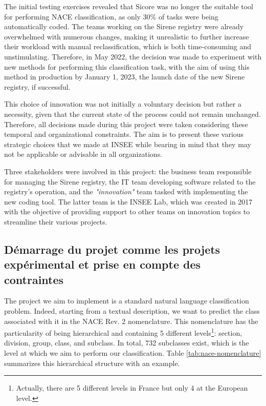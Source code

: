 The initial testing exercises revealed that Sicore was no longer the suitable tool for performing NACE classification, as only 30\% of tasks were being automatically coded. The teams working on the Sirene registry were already overwhelmed with numerous changes, making it unrealistic to further increase their workload with manual reclassification, which is both time-consuming and unstimulating. Therefore, in May 2022, the decision was made to experiment with new methods for performing this classification task, with the aim of using this method in production by January 1, 2023, the launch date of the new Sirene registry, if successful.

This choice of innovation was not initially a voluntary decision but rather a necessity, given that the current state of the process could not remain unchanged. Therefore, all decisions made during this project were taken considering these temporal and organizational constraints. The aim is to present these various strategic choices that we made at INSEE while bearing in mind that they may not be applicable or advisable in all organizations.

Three stakeholders were involved in this project: the business team responsible for managing the Sirene registry, the IT team developing software related to the registry's operation, and the \textit{"innovation"} team tasked with implementing the new coding tool. The latter team is the INSEE Lab, which was created in 2017 with the objective of providing support to other teams on innovation topics to streamline their various projects.

\subsection{Démarrage du projet comme les projets expérimental et prise en compte des contraintes}


The project we aim to implement is a standard natural language classification problem. Indeed, starting from a textual description, we want to predict the class associated with it in the NACE Rev. 2 nomenclature. This nomenclature has the particularity of being hierarchical and containing 5 different levels\footnote{Actually, there are 5 different levels in France but only 4 at the European level.}: section, division, group, class, and subclass. In total, 732 subclasses exist, which is the level at which we aim to perform our classification. Table \ref{tab:nace-nomenclature} summarizes this hierarchical structure with an example.

